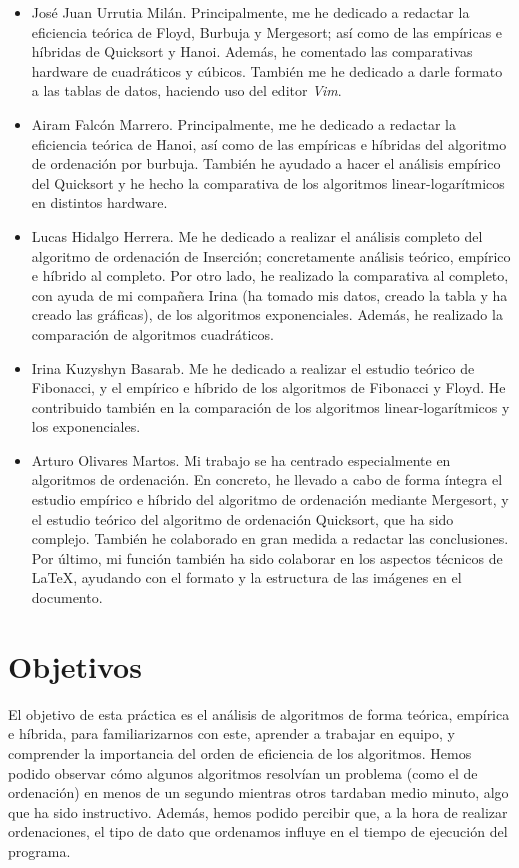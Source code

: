 \documentclass[12pt]{article}
\begin{document}
    \begin{itemize}
        \item José Juan Urrutia Milán. Principalmente, me he dedicado a redactar la eficiencia teórica de Floyd, Burbuja y Mergesort; así como de las empíricas e híbridas de Quicksort y Hanoi. Además, he comentado las comparativas hardware de cuadráticos y cúbicos.
        También me he dedicado a darle formato a las tablas de datos, haciendo uso del editor \emph{Vim}.
        \item Airam Falcón Marrero. Principalmente, me he dedicado a redactar la eficiencia teórica de Hanoi, así como de las empíricas e híbridas del algoritmo de ordenación por burbuja. También he ayudado a hacer el análisis empírico del Quicksort y he hecho la comparativa de los algoritmos linear-logarítmicos en distintos hardware.
        \item Lucas Hidalgo Herrera. Me he dedicado a realizar el análisis completo del algoritmo de ordenación de Inserción; concretamente análisis teórico, empírico e híbrido al completo. Por otro lado, he realizado la comparativa al completo, con ayuda de mi compañera Irina (ha tomado mis datos, creado la tabla y ha creado las gráficas), de los algoritmos exponenciales. Además, he realizado la comparación de algoritmos cuadráticos.
        \item Irina Kuzyshyn Basarab. Me he dedicado a realizar el estudio teórico de Fibonacci, y el empírico e híbrido de los algoritmos de Fibonacci y Floyd. He contribuido también en la comparación de los algoritmos linear-logarítmicos y los exponenciales. 
        \item Arturo Olivares Martos. Mi trabajo se ha centrado especialmente en algoritmos de ordenación. En concreto, he llevado a cabo de forma íntegra el estudio empírico e híbrido del algoritmo de ordenación mediante Mergesort, y el estudio teórico del algoritmo de ordenación Quicksort, que ha sido complejo. También he colaborado en gran medida a redactar las conclusiones. Por último, mi función también ha sido colaborar en los aspectos técnicos de \LaTeX, ayudando con el formato y la estructura de las imágenes en el documento.
    \end{itemize}
    
    
    \section{Objetivos}
    El objetivo de esta práctica es el análisis de algoritmos de forma teórica, empírica e híbrida, para familiarizarnos con este, aprender a trabajar en equipo, y comprender la importancia del orden de eficiencia de los algoritmos. Hemos podido observar cómo algunos algoritmos resolvían un problema (como el de ordenación) en menos de un segundo mientras otros tardaban medio minuto, algo que ha sido instructivo. Además, hemos podido percibir que, a la hora de realizar ordenaciones, el tipo de dato que ordenamos influye en el tiempo de ejecución del programa.
\end{document}
